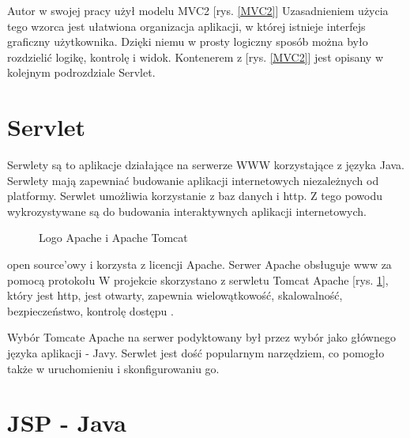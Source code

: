 \documentclass[eng,printmode,oneside]{mgr}
\begin{document}
Autor w swojej pracy użył modelu MVC2 [rys. \ref{MVC2}]
Uzasadnieniem użycia tego wzorca jest ułatwiona organizacja aplikacji, w której
istnieje interfejs graficzny użytkownika. Dzięki niemu w prosty logiczny sposób
można było rozdzielić logikę, kontrolę i widok. Kontenerem z [rys. \ref{MVC2}]
jest opisany w kolejnym podrozdziale Servlet.

\section{Servlet}

Serwlety są to aplikacje działające na serwerze WWW korzystające z języka Java.
Serwlety mają zapewniać budowanie aplikacji internetowych niezależnych od
platformy. Serwlet umożliwia korzystanie z baz danych i http. Z tego powodu
wykrozystywane są do budowania interaktywnych aplikacji internetowych. 
\begin{figure}
\label{apache}
\centering
\captionsetup{justification=centering,margin=0.5cm}
\vspace{-20pt}
\begin{center}
\end{center}
\vspace{-20pt}
\caption{Logo Apache i Apache Tomcat \cite{apache.org}}
\vspace{-10pt}
\end{figure}

open source'owy i korzysta z licencji Apache. Serwer Apache obsługuje www za pomocą protokołu
W projekcie skorzystano z serwletu Tomcat Apache [rys. \ref{apache}], który jest
http, jest otwarty, zapewnia wielowątkowość, skalowalność, bezpieczeństwo,
kontrolę dostępu \cite{apache.wiki}. 


Wybór Tomcate Apache na serwer podyktowany był przez wybór jako głównego języka
aplikacji - Javy. Serwlet jest dość popularnym narzędziem, co pomogło także w
uruchomieniu i skonfigurowaniu go.
\section{JSP - Java}
\end{document}
